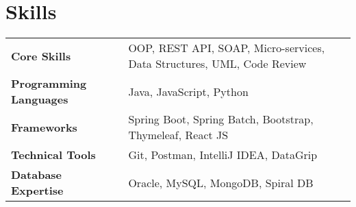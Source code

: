 \section{\textbf{Skills}}
\begin{tabularx}{\linewidth}{@{}l X@{}}
    \textbf{Core Skills} & \normalsize{OOP, REST API, SOAP, Micro-services, Data Structures, UML, Code Review}
    \\ \textbf{Programming Languages} & \normalsize{Java, JavaScript, Python} \\
    \textbf{Frameworks} & \normalsize{Spring Boot, Spring Batch, Bootstrap, Thymeleaf, React JS}
    \\ \textbf{Technical Tools} & \normalsize{Git, Postman, IntelliJ IDEA, DataGrip}
    \\ \textbf{Database Expertise} & \normalsize{Oracle, MySQL, MongoDB, Spiral DB}
    \\
\end{tabularx}
